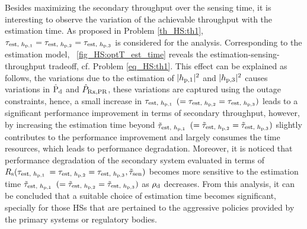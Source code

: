 Besides maximizing the secondary throughput over the sensing time, it is interesting to observe the variation of the achievable throughput with the estimation time.
As proposed in Problem \ref{th_HS:th1}, $\tau_{\text{est, $h_{\text{p,1}}$}} = \tau_{\text{est, $h_{\text{p,2}}$}} = \tau_{\text{est, $h_{\text{p,3}}$}}$ is considered for the analysis. Corresponding to the estimation model, \figurename~\ref{fig_HS:optT_est_time} reveals the estimation-sensing-throughput tradeoff, cf. Problem \ref{eq_HS:th1}. This effect can be explained as follows, the variations due to the estimation of $|h_{\text{p,1}}|^2$ and $|h_{\text{p,3}}|^2$ causes variations in $\hat{\text{P}}_{\text{d}}$ and $\hat{P}_{\text{Rx,PR}}$, these variations are captured using the outage constraints, hence, a small increase in $\tau_{\text{est, $h_{\text{p,1}}$}}$ $(= \tau_{\text{est, $h_{\text{p,2}}$}} = \tau_{\text{est, $h_{\text{p,3}}$}})$ leads to a significant performance improvement in terms of secondary throughput, however, by increasing the estimation time beyond $\tilde{\tau}_{\text{est, $h_{\text{p,1}}$}}$ $(= \tilde{\tau}_{\text{est, $h_{\text{p,2}}$}}= \tilde{\tau}_{\text{est, $h_{\text{p,3}}$}})$ slightly contributes to the performance improvement and largely consumes the time resources, which leads to performance degradation. Moreover, it is noticed that performance degradation of the secondary system evaluated in terms of $R_{\text{s}}(\tau_{\text{est, $h_{\text{p,1}}$}}$ $= \tau_{\text{est, $h_{\text{p,2}}$}} = \tau_{\text{est, $h_{\text{p,3}}$}}, \tilde{\tau}_{\text{sen}})$ becomes more sensitive to the estimation time $\tilde{\tau}_{\text{est, $h_{\text{p,1}}$}}$ $(= \tilde{\tau}_{\text{est, $h_{\text{p,2}}$}}= \tilde{\tau}_{\text{est, $h_{\text{p,3}}$}})$ as $\rho_{\text{d}}$ decreases. From this analysis, it can be concluded that a suitable choice of estimation time becomes significant, specially for those HSs that are pertained to the aggressive policies provided by the primary systems or regulatory bodies. 


